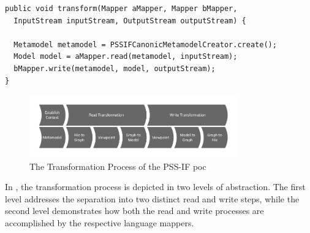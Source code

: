 \begin{verbatim}
public void transform(Mapper aMapper, Mapper bMapper,
  InputStream inputStream, OutputStream outputStream) {
  
  Metamodel metamodel = PSSIFCanonicMetamodelCreator.create();
  Model model = aMapper.read(metamodel, inputStream);
  bMapper.write(metamodel, model, outputStream);
}
\end{verbatim}

\begin{figure}[h]
\centering
\includegraphics[width=0.8\textwidth]{figures/process.pdf}
\caption{The Transformation Process of the PSS-IF \gls{poc}}
\label{fig:transformationprocess}
\end{figure}

In , the transformation process is depicted in two levels of abstraction. The first level addresses the separation into two distinct read and write steps, while the second level demonstrates how both the read and write processes are accomplished by the respective language mappers.
